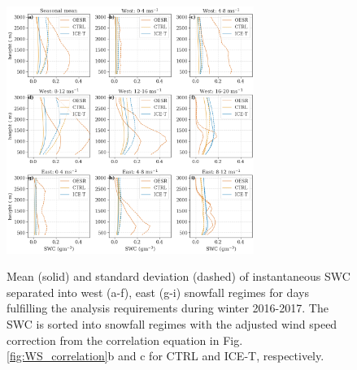 \documentclass{ametsocV5}
\begin{document}
\begin{figure}
    \noindent\includegraphics[width=19pc,angle=0]{fig9.png}\\
    \caption{Mean (solid) and standard deviation (dashed) of instantaneous SWC separated into west (a-f), east (g-i) snowfall regimes for days fulfilling the analysis requirements during winter 2016-2017. The SWC is sorted into snowfall regimes with the adjusted wind speed correction from the correlation equation in Fig. \ref{fig:WS_correlation}b and c for CTRL and ICE-T, respectively.
}
    \label{fig:vert_swc}
\end{figure}
\end{document}
